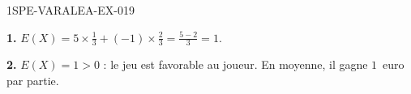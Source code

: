 \begin{corrige}{1SPE-VARALEA-EX-019}

\textbf{1.} $E(X) = 5 \times \frac{1}{3} + (-1) \times \frac{2}{3} = \frac{5-2}{3} = 1$.

\medskip
\textbf{2.} $E(X) = 1 > 0$ : le jeu est favorable au joueur. En moyenne, il gagne $1$~euro par partie.

\end{corrige}
